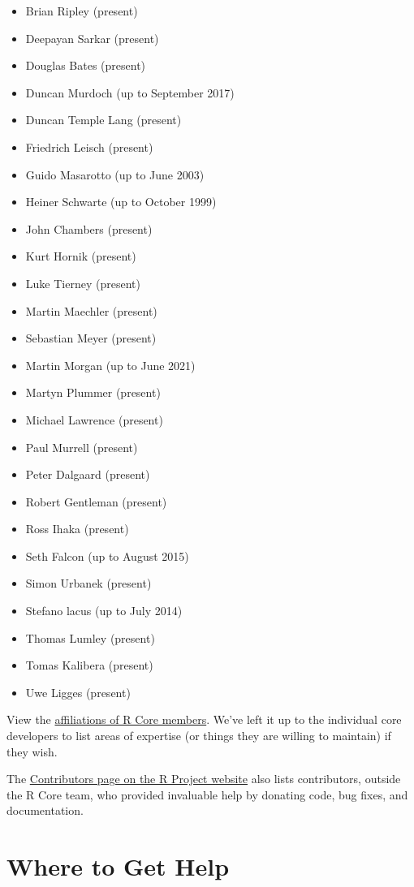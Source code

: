 \documentclass[
]{book}
\providecommand{\tightlist}{%
  \setlength{\itemsep}{0pt}\setlength{\parskip}{0pt}}
\begin{document}
\begin{itemize}
\tightlist
\item
  Brian Ripley (present)
\item
  Deepayan Sarkar (present)
\item
  Douglas Bates (present)
\item
  Duncan Murdoch (up to September 2017)
\item
  Duncan Temple Lang (present)
\item
  Friedrich Leisch (present)
\item
  Guido Masarotto (up to June 2003)
\item
  Heiner Schwarte (up to October 1999)
\item
  John Chambers (present)
\item
  Kurt Hornik (present)
\item
  Luke Tierney (present)
\item
  Martin Maechler (present)
\item
  Sebastian Meyer (present)
\item
  Martin Morgan (up to June 2021)
\item
  Martyn Plummer (present)
\item
  Michael Lawrence (present)
\item
  Paul Murrell (present)
\item
  Peter Dalgaard (present)
\item
  Robert Gentleman (present)
\item
  Ross Ihaka (present)
\item
  Seth Falcon (up to August 2015)
\item
  Simon Urbanek (present)
\item
  Stefano lacus (up to July 2014)
\item
  Thomas Lumley (present)
\item
  Tomas Kalibera (present)
\item
  Uwe Ligges (present)
\end{itemize}

View the \href{}{affiliations of R Core members}. We've left it up to the individual core developers to list areas of expertise (or things they are willing to maintain) if they wish.

The \href{https://www.r-project.org/contributors.html}{Contributors page on the R Project website} also lists contributors, outside the R Core team, who provided invaluable help by donating code, bug fixes, and documentation.

\hypertarget{WhereToGetHelp}{%
\chapter{Where to Get Help}\label{WhereToGetHelp}}
\end{document}
